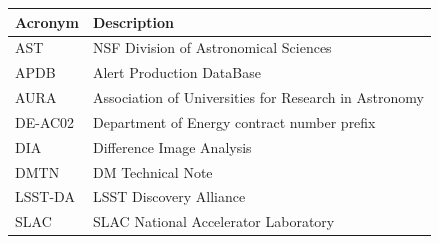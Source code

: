 \addtocounter{table}{-1}
\begin{longtable}{p{}p{}}\hline
\textbf{Acronym} & \textbf{Description}  \\\hline

AST & NSF Division of Astronomical Sciences \\\hline
APDB & Alert Production DataBase\\\hline
AURA & Association of Universities for Research in Astronomy \\\hline
DE-AC02 & Department of Energy contract number prefix \\\hline
DIA & Difference Image Analysis \\\hline
DMTN & DM Technical Note \\\hline
LSST-DA & LSST Discovery Alliance \\\hline
SLAC & SLAC National Accelerator Laboratory \\\hline
\end{longtable}
